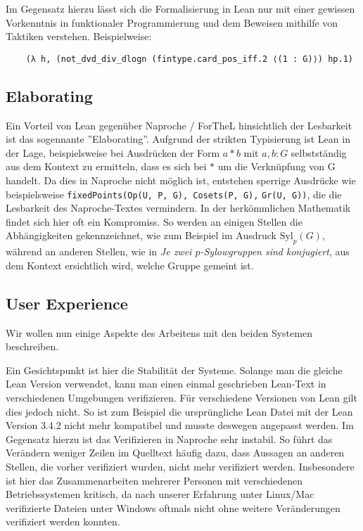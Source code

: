 \documentclass[a4paper,12pt]{scrartcl}
\begin{document}
\medskip

Im Gegensatz hierzu lässt sich die Formalisierung in Lean nur mit einer gewissen Vorkenntnis in funktionaler Programmierung und dem Beweisen mithilfe von Taktiken verstehen. Beispielweise:
\lstset{language=lean}
\begin{lstlisting}
    (λ h, (not_dvd_div_dlogn (fintype.card_pos_iff.2 ⟨(1 : G)⟩) hp.1) 
\end{lstlisting}

\subsection{Elaborating}

Ein Vorteil von Lean gegenüber Naproche / ForTheL hinsichtlich der Lesbarkeit ist das sogennante ''Elaborating''. Aufgrund der strikten Typisierung ist Lean in der Lage, beispielsweise bei Ausdrücken der Form $a * b$ mit $a, b : G$ selbstständig aus dem Kontext zu ermitteln, dass es sich bei $*$ um die Verknüpfung von G handelt. Da dies in Naproche nicht möglich ist, entstehen sperrige Ausdrücke wie beispielsweise \verb!fixedPoints(Op(U, P, G), Cosets(P, G),! \verb!Gr(U, G))!, die die Lesbarkeit des Naproche-Textes vermindern.
In der herkömmlichen Mathematik findet sich hier oft ein Kompromiss. So werden an einigen Stellen die Abhängigkeiten gekennzeichnet, wie zum Beispiel im Ausdruck $\text{Syl}_{p}(G)$, während an anderen Stellen, wie in \textit{Je zwei $p$-Sylowgruppen sind konjugiert}, aus dem Kontext ersichtlich wird, welche Gruppe gemeint ist.

\subsection{User Experience}

Wir wollen nun einige Aspekte des Arbeitens mit den beiden Systemen beschreiben.

Ein Gesichtspunkt ist hier die Stabilität der Systeme. Solange man die gleiche Lean Version verwendet, kann man einen einmal geschrieben Lean-Text in verschiedenen Umgebungen verifizieren. Für verschiedene Versionen von Lean gilt dies jedoch nicht. So ist zum Beispiel die ursprüngliche Lean Datei \cite{bibtex.c} mit der Lean Version 3.4.2 nicht mehr kompatibel und musste deswegen angepasst werden.
Im Gegensatz hierzu ist das Verifizieren in Naproche sehr instabil. So führt das Verändern weniger Zeilen im Quelltext häufig dazu, dass Aussagen an anderen Stellen, die vorher verifiziert wurden, nicht mehr verifiziert werden. Insbesondere ist hier das Zusammenarbeiten mehrerer Personen mit verschiedenen Betriebssystemen kritisch, da nach unserer Erfahrung unter Linux/Mac verifizierte Dateien unter Windows oftmals nicht ohne weitere Veränderungen verifiziert werden konnten. 
\end{document}
